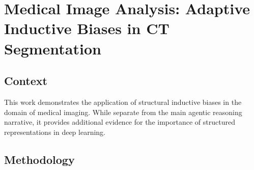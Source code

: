 \chapter{Medical Image Analysis: Adaptive Inductive Biases in CT Segmentation}
\label{app:ct-segmentation}

\section*{Context}
This work demonstrates the application of structural inductive biases in the domain of medical imaging. While separate from the main agentic reasoning narrative, it provides additional evidence for the importance of structured representations in deep learning.

\section{Methodology}
\blindtext
